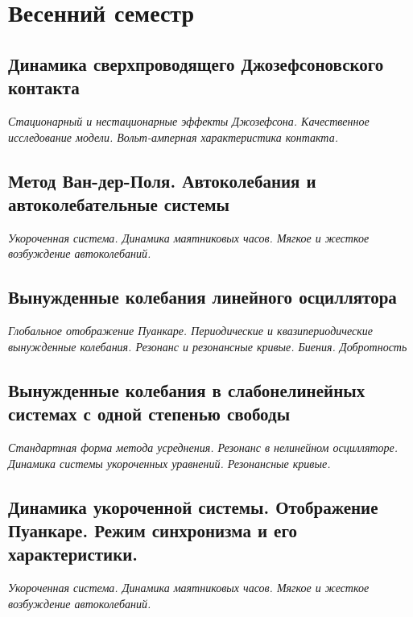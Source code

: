 \documentclass[14pt,a4paper]{extreport}
\theoremstyle{definition}
\begin{document}
\part{Весенний семестр}
\newpage
\chapter{Динамика сверхпроводящего Джозефсоновского контакта}
\epigraph{\textit{Стационарный и нестационарные эффекты Джозефсона.
Качественное исследование модели. Вольт-амперная
характеристика контакта.}}{}
\label{sec:lect11}
    

\newpage
\chapter{Метод Ван-дер-Поля. Автоколебания и автоколебательные системы}
\epigraph{\textit{Укороченная система. Динамика маятниковых часов. Мягкое и
жесткое возбуждение автоколебаний.}}{}
\label{sec:lect12}
    

\newpage
\chapter{Вынужденные колебания линейного осциллятора}
\epigraph{\textit{Глобальное отображение Пуанкаре. Периодические и
квазипериодические вынужденные колебания. Резонанс и
резонансные кривые. Биения. Добротность}}{}
\label{sec:lect13}
    


\newpage
\chapter{Вынужденные колебания в слабонелинейных системах
с одной степенью свободы}
\epigraph{\textit{Стандартная форма метода усреднения. Резонанс в нелинейном
осцилляторе. Динамика системы укороченных уравнений.
Резонансные кривые.}}{}
\label{sec:lect14}
    

\newpage
\chapter{Динамика укороченной системы. Отображение Пуанкаре. Режим
синхронизма и его характеристики.}
\epigraph{\textit{Укороченная система. Динамика маятниковых часов. Мягкое и
жесткое возбуждение автоколебаний.}}{}
\label{sec:lect15}
    

%      
\end{document}
